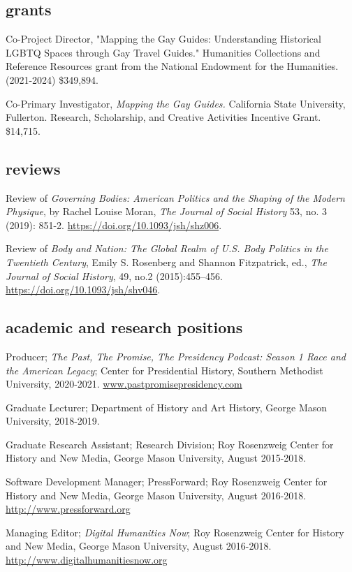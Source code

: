 \documentclass[11pt]{article}
\begin{document}
\subsection{grants}
Co-Project Director, "Mapping the Gay Guides: Understanding Historical LGBTQ Spaces through Gay Travel Guides." Humanities Collections and Reference Resources grant from the National Endowment for the Humanities. (2021-2024) \$349,894.

Co-Primary Investigator, \emph{Mapping the Gay Guides.} California State University, Fullerton. Research, Scholarship, and Creative Activities Incentive Grant. \$14,715.

\subsection{reviews}\label{reviews}

Review of \emph{Governing Bodies: American Politics and the Shaping of the Modern Physique}, by Rachel Louise Moran, \emph{The Journal of Social History} 53, no. 3 (2019): 851-2. \url{https://doi.org/10.1093/jsh/shz006}.

Review of \emph{Body and Nation: The Global Realm of U.S. Body Politics in the Twentieth Century}, Emily S. Rosenberg and Shannon Fitzpatrick, ed., \emph{The Journal of Social History}, 49, no.2 (2015):455–456. \url{https://doi.org/10.1093/jsh/shv046}.

\subsection{academic and research positions}
Producer; \emph{The Past, The Promise, The Presidency Podcast: Season 1 Race and the American Legacy}; Center for Presidential History, Southern Methodist University, 2020-2021. \url{www.pastpromisepresidency.com}

Graduate Lecturer; Department of History and Art History, George Mason University, 2018-2019.

Graduate Research Assistant; Research Division; Roy Rosenzweig Center for History and New Media, George Mason University, August 2015-2018.

Software Development Manager; PressForward; Roy Rosenzweig Center for History and New Media, George Mason University, August 2016-2018. \url{http://www.pressforward.org}

Managing Editor; \emph{Digital Humanities Now}; Roy Rosenzweig Center for History and New Media, George Mason University, August 2016-2018. \url{http://www.digitalhumanitiesnow.org}
\end{document}
